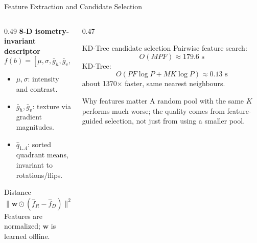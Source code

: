 \documentclass[10pt,aspectratio=169]{beamer}
\begin{document}
\begin{frame}{Feature Extraction and Candidate Selection}
  \begin{columns}[T,onlytextwidth]
    \begin{column}{0.49\textwidth}
      \textbf{8-D isometry-invariant descriptor}
      \[
        f(b)=
        [\mu,\sigma,\bar g_h,\bar g_v,\hat q_1,\hat q_2,\hat q_3,\hat q_4]
      \]
      \begin{itemize}
        \item $\mu,\sigma$: intensity and contrast.
        \item $\bar g_h,\bar g_v$: texture via gradient magnitudes.
        \item $\hat q_{1..4}$: sorted quadrant means, invariant to rotations/flips.
      \end{itemize}
      \begin{block}{Distance}
        \[
          \|\mathbf w\odot(\hat f_R-\hat f_D)\|^2
        \]
        Features are normalized; $\mathbf w$ is learned offline.
      \end{block}
    \end{column}
    \hfill
    \begin{column}{0.47\textwidth}
      \begin{exampleblock}{KD-Tree candidate selection}
        Pairwise feature search:
        \[
          O(MPF)\approx179.6\text{ s}
        \]
        KD-Tree:
        \[
          O(PF\log P+MK\log P)\approx0.13\text{ s}
        \]
        \centering \alert{about 1370$\times$ faster, same nearest neighbours.}
      \end{exampleblock}
      \begin{alertblock}{Why features matter}
        A random pool with the same $K$ performs much worse; the quality comes from
        feature-guided selection, not just from using a smaller pool.
      \end{alertblock}
    \end{column}
  \end{columns}
\end{frame}
\end{document}
